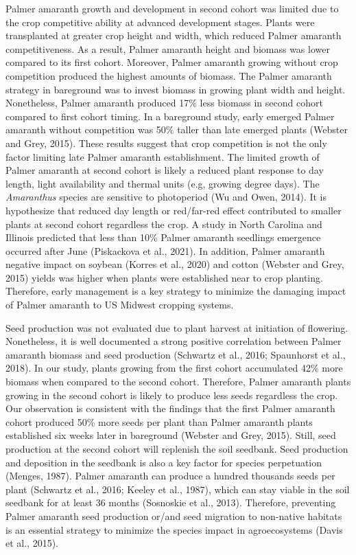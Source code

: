 \documentclass[utf8]{frontiersSCNS}
\begin{document}
Palmer amaranth growth and development in second cohort was limited due
to the crop competitive ability at advanced development stages. Plants
were transplanted at greater crop height and width, which reduced Palmer
amaranth competitiveness. As a result, Palmer amaranth height and
biomass was lower compared to its first cohort. Moreover, Palmer
amaranth growing without crop competition produced the highest amounts
of biomass. The Palmer amaranth strategy in bareground was to invest
biomass in growing plant width and height. Nonetheless, Palmer amaranth
produced 17\% less biomass in second cohort compared to first cohort
timing. In a bareground study, early emerged Palmer amaranth without
competition was 50\% taller than late emerged plants (Webster and Grey,
2015). These results suggest that crop competition is not the only
factor limiting late Palmer amaranth establishment. The limited growth
of Palmer amaranth at second cohort is likely a reduced plant response
to day length, light availability and thermal units (e.g, growing degree
days). The \emph{Amaranthus} species are sensitive to photoperiod (Wu
and Owen, 2014). It is hypothesize that reduced day length or
red/far-red effect contributed to smaller plants at second cohort
regardless the crop. A study in North Carolina and Illinois predicted
that less than 10\% Palmer amaranth seedlings emergence occurred after
June (Piskackova et al., 2021). In addition, Palmer amaranth negative
impact on soybean (Korres et al., 2020) and cotton (Webster and Grey,
2015) yields was higher when plants were established near to crop
planting. Therefore, early management is a key strategy to minimize the
damaging impact of Palmer amaranth to US Midwest cropping systems.

Seed production was not evaluated due to plant harvest at initiation of
flowering. Nonetheless, it is well documented a strong positive
correlation between Palmer amaranth biomass and seed production
(Schwartz et al., 2016; Spaunhorst et al., 2018). In our study, plants
growing from the first cohort accumulated 42\% more biomass when
compared to the second cohort. Therefore, Palmer amaranth plants growing
in the second cohort is likely to produce less seeds regardless the
crop. Our observation is consistent with the findings that the first
Palmer amaranth cohort produced 50\% more seeds per plant than Palmer
amaranth plants established six weeks later in bareground (Webster and
Grey, 2015). Still, seed production at the second cohort will replenish
the soil seedbank. Seed production and deposition in the seedbank is
also a key factor for species perpetuation (Menges, 1987). Palmer
amaranth can produce a hundred thousands seeds per plant (Schwartz et
al., 2016; Keeley et al., 1987), which can stay viable in the soil
seedbank for at least 36 months (Sosnoskie et al., 2013). Therefore,
preventing Palmer amaranth seed production or/and seed migration to
non-native habitats is an essential strategy to minimize the species
impact in agroecosystems (Davis et al., 2015).
\end{document}
